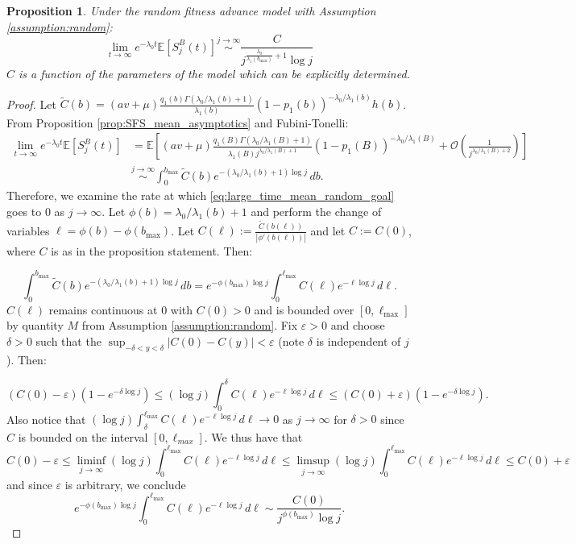 \documentclass{article}
\numberwithin{equation}{section}
\newtheorem{proposition}{Proposition}
\begin{document}
\begin{proposition}
  Under the random fitness advance model with Assumption \ref{assumption:random}:
  \[\lim_{t\to\infty}e^{-\lambda_0t}\mathbb{E}[S_j^B(t)]\overset{j\to\infty}{\sim} \frac{C}{j^{\frac{\lambda_0}{\lambda_1(b_{\max})}+1}\log j}\]
  $C$ is a function of the parameters of the model which can be explicitly determined.\label{prop:mean_SFS_random_large_freq}
\end{proposition}
\begin{proof}
  Let $\widetilde{C}(b)=(av+\mu)\frac{q_1(b)\Gamma(\lambda_0/\lambda_1(b)+1)}{\lambda_1(b)}(1-p_1(b))^{-\lambda_0/\lambda_1(b)}h(b)$. From Proposition \ref{prop:SFS_mean_asymptotics} and Fubini-Tonelli:
  \begin{align}
      \lim_{t\to\infty}e^{-\lambda_0 t}\mathbb{E}[S_j^{B}(t)]&=\mathbb{E}\left[(av+\mu)\frac{q_1(B)\Gamma(\lambda_0/\lambda_1(B)+1)}{\lambda_1(B)j^{\lambda_0/\lambda_1(B)+1}}(1-p_1(B))^{-\lambda_0/\lambda_1(B)}+\mathcal{O}\left(\frac{1}{j^{\lambda_0/\lambda_1(B)+2}}\right)\right]\nonumber\\
      &\overset{j\to\infty}{\sim} \int_0^{b_{\text{max}}}\widetilde{C}(b)e^{-\left(\lambda_0/\lambda_1(b)+1\right)\log j}\,db.\label{eq:large_time_mean_random_goal}
  \end{align}
 Therefore, we examine the rate at which \ref{eq:large_time_mean_random_goal} goes to $0$ as $j\to\infty$. Let $\phi(b)=\lambda_0/\lambda_1(b)+1$ and perform the change of variables $\ell=\phi(b)-\phi(b_{\max})$. Let $C(\ell):=\frac{\tilde{C}(b(\ell))}{|\phi'(b(\ell))|}$ and let $C:=C(0)$, where $C$ is as in the proposition statement. Then:

\[\int_0^{b_{\text{max}}}\tilde{C}(b)e^{-\left(\lambda_0/\lambda_1(b)+1\right)\log j}\,db=e^{-\phi(b_{\max})\log j}\int_0^{\ell_{\text{max}}}C(\ell)e^{-\ell\log j}\,d\ell.\]
$C(\ell)$ remains continuous at $0$ with $C(0)>0$ and is bounded over $[0,\ell_{\max}]$ by quantity $M$ from Assumption \ref{assumption:random}. Fix $\varepsilon>0$ and choose $\delta>0$ such that the $\sup_{-\delta<y<\delta}|C(0)-C(y)|<\varepsilon$ (note $\delta$ is independent of $j$).
Then:

\[(C(0)-\varepsilon)(1-e^{-\delta\log j})\leq (\log j)\int_0^\delta C(\ell)e^{-\ell \log j}\,d\ell\leq (C(0)+\varepsilon)(1-e^{-\delta\log j}).\]
Also notice that $(\log j)\int_\delta^{\ell_{\max}} C(\ell)e^{-\ell \log j}\,d\ell\to 0$ as $j\to\infty$ for $\delta>0$ since $C$ is bounded on the interval $[0,\ell_{max}].$
We thus have that
\[C(0)-\varepsilon\leq \liminf_{j\to\infty}(\log j)\int_0^{\ell_{\max}} C(\ell)e^{-\ell \log j}\,d\ell \leq \limsup_{j\to\infty}(\log j)\int_0^{\ell_{\max}} C(\ell)e^{-\ell \log j}\,d\ell\leq C(0)+\varepsilon\]
and since $\varepsilon$ is arbitrary, we conclude
\[e^{-\phi(b_{\max})\log j}\int_0^{\ell_{\text{max}}}C(\ell)e^{-\ell\log j}\,d\ell\sim \frac{C(0)}{j^{\phi(b_{\max})}\log j}.\]
\end{proof}
\end{document}
